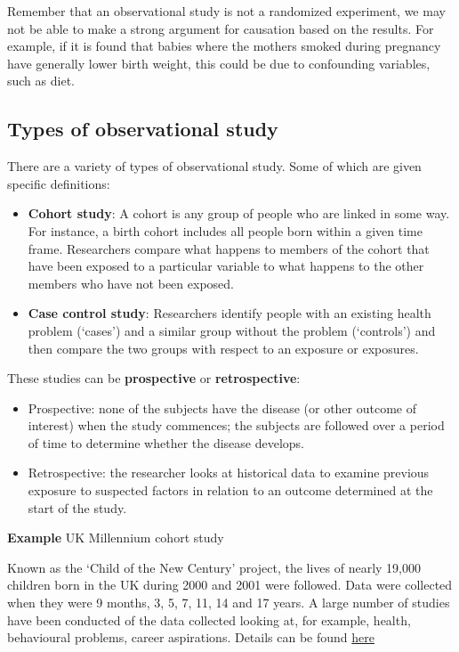 \documentclass[
  oneside]{krantz}
\begin{document}
Remember that an observational study is not a randomized experiment, we may not be able to make a strong argument for causation based on the results. For example, if it is found that babies where the mothers smoked during pregnancy have generally lower birth weight, this could be due to confounding variables, such as diet.

\hypertarget{types-of-observational-study}{%
\subsection{Types of observational study}\label{types-of-observational-study}}

There are a variety of types of observational study. Some of which are given specific definitions:

\begin{itemize}
\item
  \textbf{Cohort study}: A cohort is any group of people who are linked in some way. For instance, a birth cohort includes all people born within a given time frame. Researchers compare what happens to members of the cohort that have been exposed to a particular variable to what happens to the other members who have not been exposed.
\item
  \textbf{Case control study}: Researchers identify people with an existing health problem (`cases') and a similar group without the problem (`controls') and then compare the two groups with respect to an exposure or exposures.
\end{itemize}

These studies can be \textbf{prospective} or \textbf{retrospective}:

\begin{itemize}
\item
  Prospective: none of the subjects have the disease (or other outcome of interest) when the study commences; the subjects are followed over a period of time to determine whether the disease develops.
\item
  Retrospective: the researcher looks at historical data to examine previous exposure to suspected factors in relation to an outcome determined at the start of the study.
\end{itemize}

\textbf{Example} UK Millennium cohort study

Known as the `Child of the New Century' project, the lives of nearly 19,000 children born in the UK during 2000 and 2001 were followed. Data were collected when they were 9 months, 3, 5, 7, 11, 14 and 17 years. A large number of studies have been conducted of the data collected looking at, for example, health, behavioural problems, career aspirations. Details can be found \href{https://cls.ucl.ac.uk/cls-studies/millennium-cohort-study/}{here}
\end{document}
